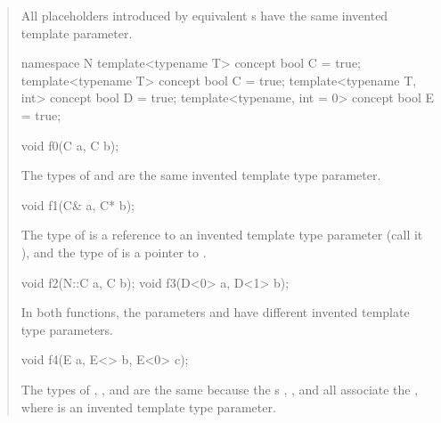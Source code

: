 \begin{quote}
\pnum
All placeholders introduced by equivalent 
s
have the same invented template parameter.
% 
\enterexample
\begin{codeblock}
namespace N {
  template<typename T> concept bool C = true;
}
template<typename T> concept bool C = true;
template<typename T, int> concept bool D = true;
template<typename, int = 0> concept bool E = true;

void f0(C a, C b);
\end{codeblock}
The types of  and  are the same invented template
type parameter.
% 
\begin{codeblock}
void f1(C& a, C* b);
\end{codeblock}
The type of  is a reference to an invented template type parameter 
(call it ), and the type of  is a pointer to 
.
% 
\begin{codeblock}
void f2(N::C a, C b);
void f3(D<0> a, D<1> b);
\end{codeblock}
In both functions, the parameters  and
 have different invented template type parameters.
% 
\begin{codeblock}
void f4(E a, E<> b, E<0> c);
\end{codeblock}
The types of , , and  are the same because the 
s , , and 
 all associate the 
, where  is an invented template type parameter.
\end{quote}

% 
% 
